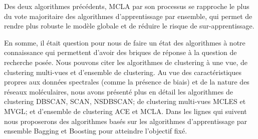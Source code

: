   	  Des deux algorithmes précédents, MCLA par son processus se rapproche le plus du vote majoritaire des algorithmes d'apprentissage par ensemble, qui permet de rendre plus robuste le modèle globale et de réduire le risque de sur-apprentissage.
    
   	 En somme, il était question pour nous de faire un état des algorithmes à notre connaissance qui permettent d'avoir des briques de réponse à la question de recherche posée. Nous pouvons citer les algorithmes de clustering à une vue, de clustering multi-vues et d'ensemble de clustering. Au vue des caractéristiques propres aux données spectrales (comme la présence de biais) et de la nature des réseaux moléculaires, nous avons présenté plus en détail les algorithmes de clustering \acrshort{DBSCAN}, \acrshort{SCAN}, \acrshort{NSDBSCAN}; de clustering multi-vues \acrshort{MCLES} et \acrshort{MVGL}; et d'ensemble de clustering \acrshort{ACE} et \acrshort{MCLA}.
   	 Dans les lignes qui suivent nous proposerons des algorithmes basés sur les algorithmes d'apprentissage par ensemble Bagging et Boosting pour atteindre l’objectif fixé.
  	 